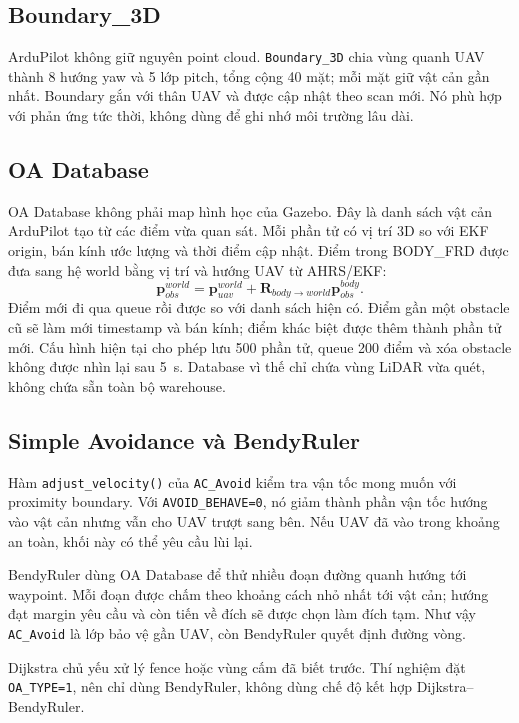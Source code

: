 \documentclass[11pt,a4paper]{article}
\begin{document}
\subsection{Boundary\_3D}

ArduPilot không giữ nguyên point cloud. \texttt{Boundary\_3D} chia vùng quanh UAV thành 8 hướng yaw và 5 lớp pitch, tổng cộng 40 mặt; mỗi mặt giữ vật cản gần nhất. Boundary gắn với thân UAV và được cập nhật theo scan mới. Nó phù hợp với phản ứng tức thời, không dùng để ghi nhớ môi trường lâu dài.

\subsection{OA Database}

OA Database không phải map hình học của Gazebo. Đây là danh sách vật cản ArduPilot tạo từ các điểm vừa quan sát. Mỗi phần tử có vị trí 3D so với EKF origin, bán kính ước lượng và thời điểm cập nhật. Điểm trong BODY\_FRD được đưa sang hệ world bằng vị trí và hướng UAV từ AHRS/EKF:
\begin{equation}
  \mathbf{p}^{world}_{obs}
  = \mathbf{p}^{world}_{uav}
  + \mathbf{R}_{body\rightarrow world}\mathbf{p}^{body}_{obs}.
\end{equation}
Điểm mới đi qua queue rồi được so với danh sách hiện có. Điểm gần một obstacle cũ sẽ làm mới timestamp và bán kính; điểm khác biệt được thêm thành phần tử mới. Cấu hình hiện tại cho phép lưu 500 phần tử, queue 200 điểm và xóa obstacle không được nhìn lại sau 5~s. Database vì thế chỉ chứa vùng LiDAR vừa quét, không chứa sẵn toàn bộ warehouse.

\subsection{Simple Avoidance và BendyRuler}

Hàm \texttt{adjust\_velocity()} của \texttt{AC\_Avoid} kiểm tra vận tốc mong muốn với proximity boundary. Với \texttt{AVOID\_BEHAVE=0}, nó giảm thành phần vận tốc hướng vào vật cản nhưng vẫn cho UAV trượt sang bên. Nếu UAV đã vào trong khoảng an toàn, khối này có thể yêu cầu lùi lại.

BendyRuler dùng OA Database để thử nhiều đoạn đường quanh hướng tới waypoint. Mỗi đoạn được chấm theo khoảng cách nhỏ nhất tới vật cản; hướng đạt margin yêu cầu và còn tiến về đích sẽ được chọn làm đích tạm. Như vậy \texttt{AC\_Avoid} là lớp bảo vệ gần UAV, còn BendyRuler quyết định đường vòng.

Dijkstra chủ yếu xử lý fence hoặc vùng cấm đã biết trước. Thí nghiệm đặt \texttt{OA\_TYPE=1}, nên chỉ dùng BendyRuler, không dùng chế độ kết hợp Dijkstra--BendyRuler.
\end{document}
